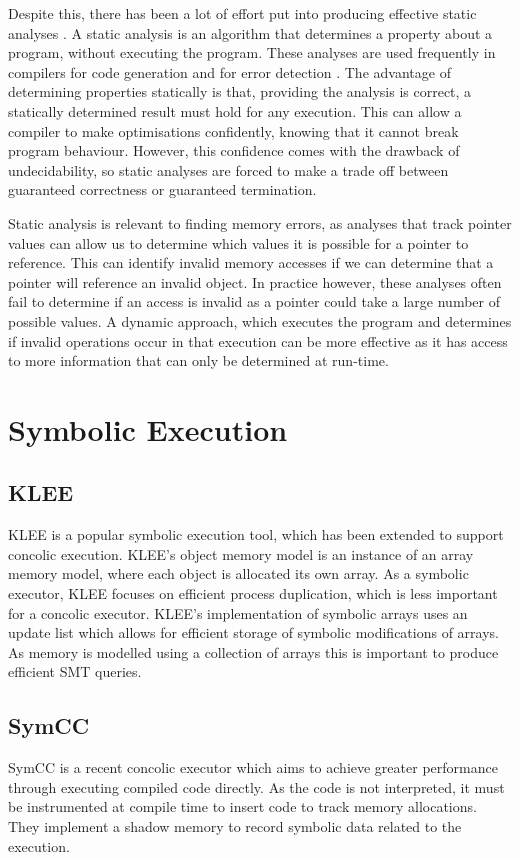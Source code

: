 \documentclass[12pt,twoside]{report}
\begin{document}
Despite this, there has been a lot of effort put into producing effective static analyses \cite{johnson1977lint,bushstaticanalysis,wilson1995efficient}. A static analysis is an algorithm that determines a property about a program, without executing the program. These analyses are used frequently in compilers for code generation \cite{wilson1995efficient} and for error detection \cite{bushstaticanalysis}. The advantage of determining properties statically is that, providing the analysis is correct, a statically determined result must hold for any execution. This can allow a compiler to make optimisations confidently, knowing that it cannot break program behaviour. However, this confidence comes with the drawback of undecidability, so static analyses are forced to make a trade off between guaranteed correctness or guaranteed termination.

Static analysis is relevant to finding memory errors, as analyses that track pointer values\cite{wilson1995efficient} can allow us to determine which values it is possible for a pointer to reference. This can identify invalid memory accesses if we can determine that a pointer will reference an invalid object. In practice however, these analyses often fail to determine if an access is invalid as a pointer could take a large number of possible values. A dynamic approach, which executes the program and determines if invalid operations occur in that execution can be more effective as it has access to more information that can only be determined at run-time.

\section{Symbolic Execution}
\subsection{KLEE}
KLEE \cite{cadar2008klee} is a popular symbolic execution tool, which has been extended to support concolic execution. KLEE's object memory model is an instance of an array memory model, where each object is allocated its own array. As a symbolic executor, KLEE focuses on efficient process duplication, which is less important for a concolic executor. KLEE's implementation of symbolic arrays uses an update list which allows for efficient storage of symbolic modifications of arrays. As memory is modelled using a collection of arrays this is important to produce efficient SMT queries.

\subsection{SymCC}
 SymCC \cite{poeplau2020symbolic} is a recent concolic executor which aims to achieve greater performance through executing compiled code directly. As the code is not interpreted, it must be instrumented at compile time to insert code to track memory allocations. They implement a shadow memory to record symbolic data related to the execution. 
\end{document}
